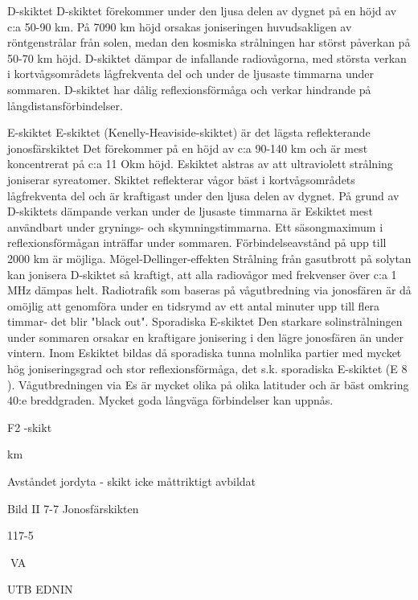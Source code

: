 \documentclass[a4paper,twoside,twocolumn,openright]{book}
\begin{document}
{{{{{{D-skiktet
D-skiktet förekommer under den ljusa delen
av dygnet på en höjd av c:a 50-90 km. På 7090 km höjd orsakas joniseringen huvudsakligen av röntgenstrålar från solen, medan
den kosmiska strålningen har störst påverkan på 50-70 km höjd. D-skiktet dämpar de
infallande radiovågorna, med största verkan
i kortvågsområdets lågfrekventa del och under de ljusaste timmarna under sommaren.
D-skiktet har dålig reflexionsförmåga och
verkar hindrande på långdistansförbindelser.

E-skiktet
E-skiktet (Kenelly-Heaviside-skiktet) är det
lägsta reflekterande jonosfärskiktet Det förekommer på en höjd av c:a 90-140 km och
är mest koncentrerat på c:a 11 Okm höjd. Eskiktet alstras av att ultraviolett strålning
joniserar syreatomer. Skiktet reflekterar vågor bäst i kortvågsområdets lågfrekventa del
och är kraftigast under den ljusa delen av
dygnet. På grund av D-skiktets dämpande
verkan under de ljusaste timmarna är Eskiktet mest användbart under grynings- och
skymningstimmarna.
Ett säsongmaximum i reflexionsförmågan inträffar under sommaren. Förbindelseavstånd på upp till 2000 km är möjliga.
Mögel-Dellinger-effekten
Strålning från gasutbrott på solytan kan jonisera D-skiktet så kraftigt, att alla radiovågor
med frekvenser över c:a 1 MHz dämpas helt.
Radiotrafik som baseras på vågutbredning
via jonosfären är då omöjlig att genomföra
under en tidsrymd av ett antal minuter upp till
flera timmar- det blir "black out".
Sporadiska E-skiktet
Den starkare solinstrålningen under sommaren orsakar en kraftigare jonisering i den
lägre jonosfären än under vintern. Inom Eskiktet bildas då sporadiska tunna molnlika
partier med mycket hög joniseringsgrad och
stor reflexionsförmåga, det s.k. sporadiska
E-skiktet (E 8 ). Vågutbredningen via Es är
mycket olika på olika latituder och är bäst
omkring 40:e breddgraden. Mycket goda
långväga förbindelser kan uppnås.

F2 -skikt

km

Avståndet jordyta - skikt icke måttriktigt avbildat

Bild II 7-7 Jonosfärskikten

117-5

VA

UTB EDNIN

}}}}}}
\end{document}

